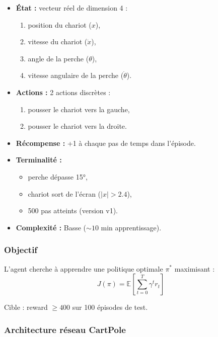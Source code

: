 \documentclass[12pt,a4paper]{article}
\begin{document}
\begin{itemize}
    \item \textbf{État :} vecteur réel de dimension 4 :
    \begin{enumerate}
        \item position du chariot ($x$),
        \item vitesse du chariot ($\dot{x}$),
        \item angle de la perche ($\theta$),
        \item vitesse angulaire de la perche ($\dot{\theta}$).
    \end{enumerate}

    \item \textbf{Actions :} 2 actions discrètes :
    \begin{enumerate}
        \item pousser le chariot vers la gauche,
        \item pousser le chariot vers la droite.
    \end{enumerate}

    \item \textbf{Récompense :} +1 à chaque pas de temps dans l'épisode.

    \item \textbf{Terminalité :}
    \begin{itemize}
        \item perche dépasse 15°,
        \item chariot sort de l'écran ($|x| > 2.4$),
        \item 500 pas atteints (version v1).
    \end{itemize}

    \item \textbf{Complexité :} Basse ($\sim 10$ min apprentissage).
\end{itemize}

\subsubsection{Objectif}

L'agent cherche à apprendre une politique optimale $\pi^*$ maximisant :
\[
J(\pi) = \mathbb{E}\left[\sum_{t=0}^{T} \gamma^t r_t\right]
\]

Cible : reward $\geq 400$ sur 100 épisodes de test.

\subsubsection{Architecture réseau CartPole}
\end{document}
